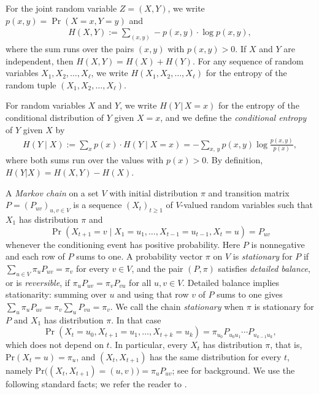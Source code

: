 \documentclass[11pt, a4paper]{article}
\theoremstyle{definition}
\theoremstyle{plain}
\renewcommand{\ge}{\geqslant}
\begin{document}
For the joint random variable $Z=(X,Y)$,  we write 
$p(x,y)= \Pr(X=x,Y=y)$ and  
\begin{align*}
  H(X,Y):= \sum_{(x,y)} - p(x,y) \cdot \log p(x,y) ,
     \end{align*}
     where the sum runs over the pairs $(x,y)$ with $ p (x,y)>0$. 
If $X$ and $Y$ are independent, then $H(X,Y)=H(X) + H(Y)$. 
For any sequence of random variables $X_1,X_2,\ldots ,X_{\ell}$, we write $H(X_1,X_2,\ldots ,X_{\ell})$ for the entropy of the random tuple $(X_1,X_2,\ldots ,X_{\ell})$. 


For random variables $X$ and $Y$, we write
$H(Y \,|\, X=x)$ for the entropy of the conditional
distribution of $Y$ given $X=x$, and we define the
{\it conditional entropy} of $Y$ given $X$ by 
\begin{align*}
  H(Y\mid X):= \sum_{x} p(x) \cdot H(Y\mid X=x)  
  = - \sum_{x,\,y} p(x,y) 
     \log \frac{p(x,y)}{p(x)}, 
\end{align*}
where both sums run over the values with $p(x)>0$. 
By definition, $H(Y | X) = H(X,Y) - H(X).$ 

\smallskip 
A \emph{Markov chain} on a set $V$ with initial
distribution $\pi$ and transition matrix
$P=(P_{uv})_{u,v\in V}$ is a sequence $(X_t)_{t\ge 1}$ of
$V$-valued random variables such that $X_1$ has
distribution $\pi$ and
\[
  \Pr (X_{t+1}=v\mid X_1=u_1,\ldots ,X_{t-1}=u_{t-1},
       X_t=u)=P_{uv}
\]
whenever the conditioning event has positive
probability. Here $P$ is nonnegative and each row of
$P$ sums to one. A probability vector $\pi$ on $V$ is
\emph{stationary} for $P$ if
$\sum_{u\in V}\pi_uP_{uv}=\pi_v$ for every $v\in V$,
and the pair $(P,\pi )$ satisfies \emph{detailed
balance}, or is \emph{reversible}, if
$\pi_uP_{uv}=\pi_vP_{vu}$ for all $u,v\in V$.
Detailed balance implies stationarity: summing over $u$
and using that row $v$ of $P$ sums to one gives
$\sum_u\pi_uP_{uv}=\pi_v\sum_uP_{vu}=\pi_v$.
We call the chain \emph{stationary} when $\pi$ is
stationary for $P$ and $X_1$ has distribution $\pi$. In
that case
\[
  \Pr (X_t=u_0,X_{t+1}=u_1,\ldots ,X_{t+k}=u_k)
  =\pi_{u_0}P_{u_0u_1}\cdots P_{u_{k-1}u_k},
\]
which does not depend on $t$. In particular, every
$X_t$ has distribution $\pi$, that is, $\mathrm{Pr}(X_t=u) = \pi_u$,  and $(X_t,X_{t+1})$ has
the same distribution for every $t$, namely 
$\mathrm{Pr}\big( (X_t,X_{t+1})=(u,v) \big) = \pi_u P_{uv}$; see \cite{CT2006}
for background. We use the following standard facts;
we refer the reader to \cite{AS2016,ZhaoYufei}. 
\end{document}
